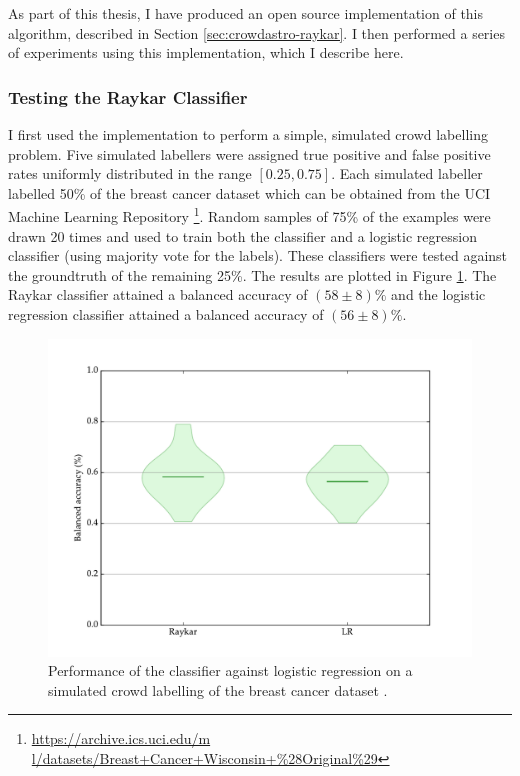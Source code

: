         As part of this thesis, I have produced an open source implementation of
        this algorithm, described in Section \ref{sec:crowdastro-raykar}. I then
        performed a series of experiments using this implementation, which I
        describe here.

        \subsubsection{Testing the Raykar Classifier}

            I first used the implementation to perform a simple, simulated crowd
            labelling problem. Five simulated labellers were assigned true positive
            and false positive rates uniformly distributed in the range $[0.25,
            0.75]$. Each simulated labeller labelled 50\% of the breast cancer
            dataset \citep{wolberg90} which can be obtained from the UCI Machine
            Learning Repository
            \citep{lichman13}\footnote{\url{https://archive.ics.uci.edu/m
            l/datasets/Breast+Cancer+Wisconsin+\%28Original\%29}}. Random samples of
            75\% of the examples were drawn 20 times and used to train both the
            \citeauthor{raykar10} classifier and a logistic regression classifier
            (using majority vote for the labels). These classifiers were tested
            against the groundtruth of the remaining 25\%. The results are plotted
            in Figure \ref{fig:raykar}. The Raykar classifier attained a balanced
            accuracy of $(58 \pm 8)\%$ and the logistic regression classifier
            attained a balanced accuracy of $(56 \pm 8)\%$.

            \begin{figure}[!ht]
                \centering
                \includegraphics[width=\textwidth]{images/experiments/raykar.pdf}
                \caption{Performance of the \citeauthor{raykar10} classifier against
                    logistic regression on a simulated crowd labelling of the breast
                    cancer dataset \citep{wolberg90}.}
                \label{fig:raykar}
            \end{figure}

